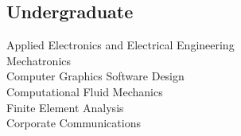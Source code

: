 \documentclass[]{deedy-resume-openfont}
\begin{document}
\begin{minipage}[t]{0.33\textwidth}
\sectionsep{}

\subsection{Undergraduate}
Applied Electronics and Electrical Engineering\\
Mechatronics \\
Computer Graphics Software Design \\
Computational Fluid Mechanics\\
Finite Element Analysis\\
Corporate Communications\\
\sectionsep


%
%

\end{minipage} 
\hfill
\end{document}
